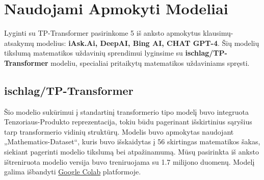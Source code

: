 \documentclass[conference]{IEEEtran}
\begin{document}









\section{Naudojami Apmokyti Modeliai}
Lyginti su TP-Transformer pasirinkome 5 iš anksto apmokytus klausimų-atsakymų modelius: \textbf{
iAsk.Ai, DeepAI, Bing AI, CHAT GPT-4}. Šių modelių tikslumą matematikos uždavinių sprendimui lyginsime su \textbf{ischlag/TP-Transformer} modeliu,
specialiai pritaikytų matematikos uždaviniams spręsti.

\subsection{ischlag/TP-Transformer}
Šio modelio sukūrimui į standartinį transformerio tipo modelį buvo integruota Tenzoriaus-Produkto
reprezentacija, tokiu būdu pagerinant išskirtinius sąryšius tarp transformerio vidinių struktūrų. \cite{tptransformer} Modelis buvo apmokytas
naudojant „Mathematics-Dataset“, kuris buvo išskaidytas į 56 skirtingas matematikos šakas, siekiant
pagerinti modelio tikslumą bei atpažinamumą. Mūsų pasirinkta iš anksto ištreniruota modelio 
versija buvo treniruojama su 1.7 milijono duomenų. Modelį galima išbandyti 
\href{https://colab.research.google.com/drive/1Zi9FOwcO_i-4FDQQGgMMfcZxZISpJNMT}{Google Colab} platformoje.
\end{document}
